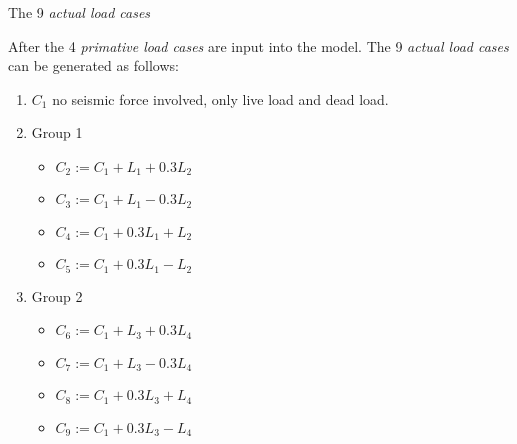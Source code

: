\begin{minipage}[l]{1.0\linewidth}
        {\large The 9 \emph{actual load cases}}

        \smallskip
        After the 4 \emph{primative load cases} are input into the model. The 9
        \emph{actual load cases} can be generated as follows:
        \begin{enumerate}
        \item $C_1$ no seismic force involved, only live load and dead load.
        \item Group 1
          \begin{itemize}
          \item $C_2:= C_1 +L_1 + 0.3 L_2$
          \item $C_3:= C_1 +L_1 - 0.3 L_2$
          \item $C_4:= C_1 +0.3 L_1 + L_2$
          \item $C_5:= C_1 +0.3 L_1 - L_2$
          \end{itemize}
        \item Group 2
          \begin{itemize}
          \item $C_6:= C_1 +L_3 + 0.3 L_4$
          \item $C_7:= C_1 +L_3 - 0.3 L_4$
          \item $C_8:= C_1 +0.3 L_3 + L_4$
          \item $C_9:= C_1 +0.3 L_3 - L_4$
          \end{itemize}
        \end{enumerate}
      \end{minipage}
